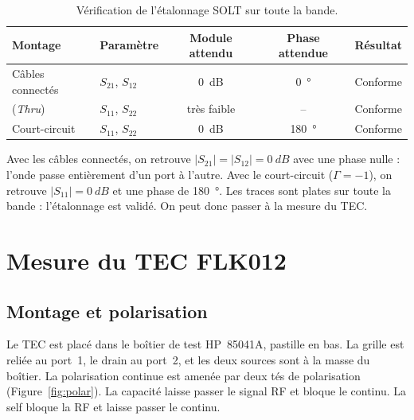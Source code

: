 \documentclass[12pt,a4paper]{article}
\begin{document}
\begin{table}[H]
\centering
\begin{tabular}{llccc}
\toprule
\textbf{Montage} & \textbf{Paramètre} & \textbf{Module attendu} & \textbf{Phase attendue} & \textbf{Résultat} \\
\midrule
Câbles connectés  & $S_{21}$, $S_{12}$ & \SI{0}{dB}   & \SI{0}{\degree}   & Conforme \\
(\textit{Thru})   & $S_{11}$, $S_{22}$ & très faible  & –                 & Conforme \\
\midrule
Court-circuit     & $S_{11}$, $S_{22}$ & \SI{0}{dB}   & \SI{180}{\degree} & Conforme \\
\bottomrule
\end{tabular}
\caption{Vérification de l’étalonnage SOLT sur toute la bande.}
\label{tab:verif}
\end{table}

Avec les câbles connectés, on retrouve $|S_{21}| = |S_{12}| = \SI{0}{dB}$ avec une phase nulle :
l’onde passe entièrement d’un port à l’autre. Avec le court-circuit ($\Gamma = -1$), on retrouve
$|S_{11}| = \SI{0}{dB}$ et une phase de \SI{180}{\degree}. Les traces sont plates sur toute la
bande : l’étalonnage est validé. On peut donc passer à la mesure du TEC.

\section{Mesure du TEC FLK012}

\subsection{Montage et polarisation}

Le TEC est placé dans le boîtier de test HP~85041A, pastille en bas. La grille est reliée au
port~1, le drain au port~2, et les deux sources sont à la masse du boîtier. La polarisation
continue est amenée par deux tés de polarisation (Figure~\ref{fig:polar}). La capacité laisse
passer le signal RF et bloque le continu. La self bloque la RF et laisse passer le continu.
\end{document}
